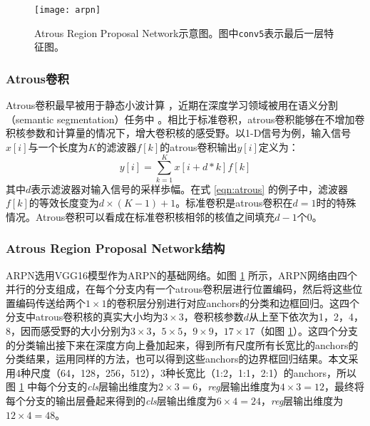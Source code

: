 \begin{figure}[h]
	\centering
	\texttt{[image: arpn]}
	\caption{Atrous Region Proposal Network示意图。图中\texttt{conv5}表示最后一层特征图。}
	\label{fig:arpn}
\end{figure}

\subsubsection{Atrous卷积}
Atrous卷积最早被用于静态小波计算 \cite{atrous}，近期在深度学习领域被用在语义分割（semantic segmentation）任务中 \cite{deeplab}。相比于标准卷积，atrous卷积能够在不增加卷积核参数和计算量的情况下，增大卷积核的感受野。以1-D信号为例，输入信号$x[i]$与一个长度为$K$的滤波器$f[k]$的atrous卷积输出$y[i]$定义为：
\begin{equation}\label{eqn:atrous}
	y[i] = \sum_{k=1}^{K} x[i+d*k]f[k]	
\end{equation}
其中$d$表示滤波器对输入信号的采样歩幅。在式 \ref{eqn:atrous} 的例子中，滤波器$f[k]$的等效长度变为$d\times(K-1)+1$。标准卷积是atrous卷积在$d=1$时的特殊情况。Atrous卷积可以看成在标准卷积核相邻的核值之间填充$d-1$个0。

\subsubsection{Atrous Region Proposal Network结构}
ARPN选用VGG16模型作为ARPN的基础网络。如图 \ref{fig:arpn} 所示，ARPN网络由四个并行的分支组成，在每个分支内有一个atrous卷积层进行位置编码，然后将这些位置编码传送给两个$1\times1$的卷积层分别进行对应anchors的分类和边框回归。这四个分支中atrous卷积核的真实大小均为$3\times3$，卷积核参数$d$从上至下依次为1，2，4，8，因而感受野的大小分别为$3\times3$，$5\times5$，$9\times9$，$17\times17$（如图 \ref{fig:arpn}）。这四个分支的分类输出接下来在深度方向上叠加起来，得到所有尺度所有长宽比的anchors的分类结果，运用同样的方法，也可以得到这些anchors的边界框回归结果。本文采用4种尺度（64，128，256，512），3种长宽比（1:2，1:1，2:1）的anchors，所以图 \ref{fig:arpn} 中每个分支的\emph{cls}层输出维度为$2\times3=6$，\emph{reg}层输出维度为$4\times3=12$，最终将每个分支的输出层叠起来得到的\emph{cls}层输出维度为$6\times4=24$，\emph{reg}层输出维度为$12\times4=48$。

